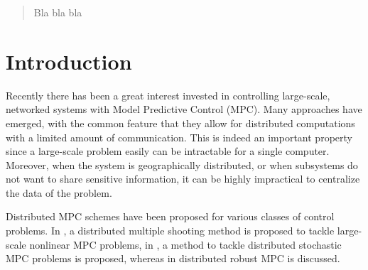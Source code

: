 
\author{Emil Klintberg         \and
        Sebastien Gros %
}



\date{Received: date / Accepted: date}


\maketitle

\begin{abstract}
Bla bla bla
\end{abstract}

\section{Introduction}

Recently there has been a great interest invested in controlling large-scale, networked systems with Model Predictive Control (MPC). Many approaches have emerged, with the common feature that they allow for distributed computations with a limited amount of communication. This is indeed an important property since a large-scale problem easily can be intractable for a single computer. Moreover, when the system is geographically distributed, or when subsystems do not want to share sensitive information, it can be highly impractical to centralize the data of the problem.

Distributed MPC schemes have been proposed for various classes of control problems. In \cite{Kozma2014}, a distributed multiple shooting method is proposed to tackle large-scale nonlinear MPC problems, in \cite{Perizzato2014}, a method to tackle distributed stochastic MPC problems is proposed, whereas in \cite{Conte2013} distributed robust MPC is discussed.

